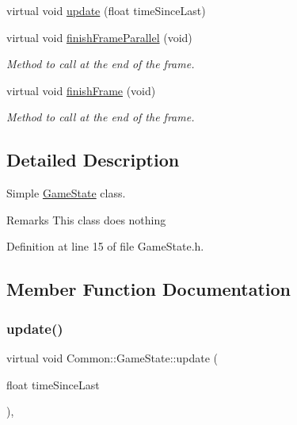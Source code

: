 \begin{DoxyCompactItemize}
virtual void \hyperlink{class_common_1_1_game_state_a38271924996d8c1bbdcbfee6ffe63f95}{update} (float time\+Since\+Last)
\item 
\mbox{\label{class_common_1_1_game_state_af9d8b5d245f12f68432653a50de46ca4}} 
virtual void \hyperlink{class_common_1_1_game_state_af9d8b5d245f12f68432653a50de46ca4}{finish\+Frame\+Parallel} (void)
\begin{DoxyCompactList}\small\item\em Method to call at the end of the frame. \end{DoxyCompactList}\item 
\mbox{\label{class_common_1_1_game_state_ade96417c05bf3ad03e5bea4ee8578d89}} 
virtual void \hyperlink{class_common_1_1_game_state_ade96417c05bf3ad03e5bea4ee8578d89}{finish\+Frame} (void)
\begin{DoxyCompactList}\small\item\em Method to call at the end of the frame. \end{DoxyCompactList}\end{DoxyCompactItemize}


\subsection{Detailed Description}
Simple \hyperlink{class_common_1_1_game_state}{Game\+State} class. 

\begin{DoxyRemark}{Remarks}
This class does nothing 
\end{DoxyRemark}


Definition at line 15 of file Game\+State.\+h.



\subsection{Member Function Documentation}
\mbox{\label{class_common_1_1_game_state_a38271924996d8c1bbdcbfee6ffe63f95}} 
\subsubsection{\texorpdfstring{update()}{update()}}
{\footnotesize\ttfamily virtual void Common\+::\+Game\+State\+::update (\begin{DoxyParamCaption}\item[{float}]{time\+Since\+Last }\end{DoxyParamCaption})\hspace{0.3cm}{\ttfamily [inline]}, {\ttfamily [virtual]}}

